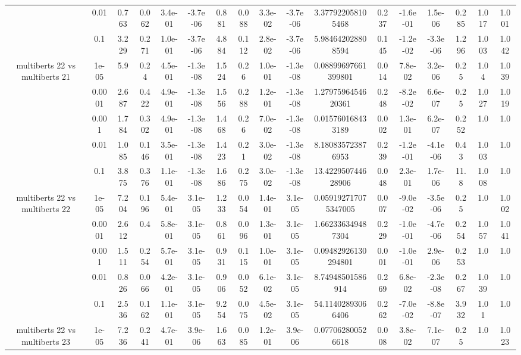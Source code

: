 \begin{tabular}{|c|c|c|c|c|c|c|c|c|c|c|c|c|c|c|c|c|}
 & 0.01 & 0.763 & 0.062 & 3.4e-01 & -3.7e-06 & 0.881 & 0.088 & 3.3e-02 & -3.7e-06 & 3.377922058105468 & 0.237 & -1.6e-01 & 1.5e-06 & 0.285 & 1.017 & 1.001 \\
 & 0.1 & 3.229 & 0.271 & 1.0e-01 & -3.7e-06 & 4.884 & 0.112 & 2.8e-02 & -3.7e-06 & 5.984642028808594 & 0.145 & -1.2e-02 & -3.3e-06 & 1.296 & 1.003 & 1.042 \\
\hline
\multirow{5}{*}{multiberts 22 vs multiberts 21} & 1e-05 & 5.9 & 0.24 & 4.5e-01 & -1.3e-08 & 1.524 & 0.26 & 1.0e-01 & -1.3e-08 & 0.08899697661399801 & 0.014 & 7.8e-02 & 3.2e-06 & 0.25 & 1.04 & 1.039 \\
 & 0.0001 & 2.687 & 0.422 & 4.9e-01 & -1.3e-08 & 1.556 & 0.288 & 1.2e-01 & -1.3e-08 & 1.2797596454620361 & 0.248 & -8.2e-02 & 6.6e-07 & 0.25 & 1.027 & 1.019 \\
 & 0.001 & 1.784 & 0.302 & 4.9e-01 & -1.3e-08 & 1.468 & 0.26 & 7.0e-02 & -1.3e-08 & 0.015760168433189 & 0.002 & 1.3e-01 & 6.2e-07 & 0.252 & 1.0 & 1.0 \\
 & 0.01 & 1.085 & 0.146 & 3.5e-01 & -1.3e-08 & 1.423 & 0.21 & 3.0e-02 & -1.3e-08 & 8.180835723876953 & 0.239 & -1.2e-01 & -4.1e-06 & 0.43 & 1.003 & 1.0 \\
 & 0.1 & 3.875 & 0.376 & 1.1e-01 & -1.3e-08 & 1.686 & 0.275 & 3.0e-02 & -1.3e-08 & 13.422950744628906 & 0.048 & 2.3e-01 & 1.7e-06 & 11.8 & 1.008 & 1.0 \\
\hline
\multirow{5}{*}{multiberts 22 vs multiberts 22} & 1e-05 & 7.204 & 0.196 & 5.4e-01 & 3.1e-05 & 1.233 & 0.054 & 1.4e-01 & 3.1e-05 & 0.059192717075347005 & 0.007 & -9.0e-02 & -3.5e-06 & 0.25 & 1.0 & 1.002 \\
 & 0.0001 & 2.612 & 0.4 & 5.8e-01 & 3.1e-05 & 0.861 & 0.096 & 1.3e-01 & 3.1e-05 & 1.662336349487304 & 0.229 & -1.0e-01 & -4.7e-06 & 0.254 & 1.057 & 1.041 \\
 & 0.001 & 1.511 & 0.254 & 5.7e-01 & 3.1e-05 & 0.931 & 0.115 & 1.0e-01 & 3.1e-05 & 0.09482926130294801 & 0.001 & -1.0e-01 & 2.9e-06 & 0.253 & 1.0 & 1.0 \\
 & 0.01 & 0.826 & 0.066 & 4.2e-01 & 3.1e-05 & 0.906 & 0.052 & 6.1e-02 & 3.1e-05 & 8.74948501586914 & 0.269 & 6.8e-02 & -2.3e-08 & 0.267 & 1.039 & 1.0 \\
 & 0.1 & 2.536 & 0.162 & 1.1e-01 & 3.1e-05 & 9.254 & 0.075 & 4.5e-02 & 3.1e-05 & 54.11402893066406 & 0.262 & -7.0e-02 & -8.8e-07 & 3.932 & 1.01 & 1.0 \\
\hline
\multirow{5}{*}{multiberts 22 vs multiberts 23} & 1e-05 & 7.236 & 0.241 & 4.7e-01 & 3.9e-06 & 1.663 & 0.085 & 1.2e-01 & 3.9e-06 & 0.077062800526618 & 0.008 & 3.8e-02 & 7.1e-07 & 0.25 & 1.0 & 1.023 \\

\end{tabular}

